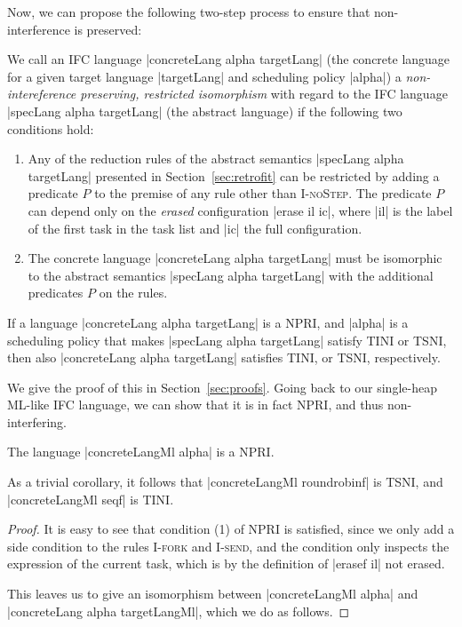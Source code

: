 Now, we can propose the following two-step process to ensure that
non-interference is preserved:
\begin{definition}
  We call an IFC language
  |concreteLang alpha targetLang| (the concrete language for a given
  target language |targetLang| and scheduling policy |alpha|)
  a \textit{non-intereference preserving,
  restricted isomorphism} with regard to the IFC language
  |specLang alpha targetLang|
  (the abstract language) if the following
  two conditions hold:
  \begin{enumerate}
    \item Any of the reduction rules of the abstract
    semantics |specLang alpha targetLang|
    presented in Section~\ref{sec:retrofit} can
    be restricted by adding a predicate $P$ to the premise of
    any rule other than \textsc{I-noStep}.  The predicate $P$
    can depend only on the \textit{erased} configuration
    |erase il ic|, where |il| is the label of the first task
    in the task list and |ic| the full configuration.
    \item The concrete language
    |concreteLang alpha targetLang|
    must be isomorphic to the abstract semantics |specLang alpha targetLang|
    with the additional predicates $P$ on the rules.
  \end{enumerate}
\end{definition}

\begin{theorem}
  \label{thm:npri}
  If a language |concreteLang alpha targetLang| is a NPRI, and |alpha|
  is a scheduling policy that makes |specLang alpha targetLang| satisfy
  TINI or TSNI, then also
  |concreteLang alpha targetLang| satisfies TINI, or TSNI, respectively.
\end{theorem}

We give the proof of this in Section~\ref{sec:proofs}.
Going back to our single-heap ML-like IFC language, we can
show that it is in fact NPRI, and thus non-interfering.

\begin{theorem}
  The language |concreteLangMl alpha| is a NPRI.
\end{theorem}
As a trivial corollary, it follows that |concreteLangMl roundrobinf| is
TSNI, and |concreteLangMl seqf| is TINI.

\begin{proof}
  It is easy to see that condition (1) of NPRI is satisfied, since
  we only add a side condition to the rules \textsc{I-fork} and
  \textsc{I-send}, and the condition only inspects the expression
  of the current task, which is by the definition of |erasef il| not
  erased.
  
  This leaves us to give an isomorphism between |concreteLangMl alpha|
  and |concreteLang alpha targetLangMl|, which we do as follows.
\end{proof}


